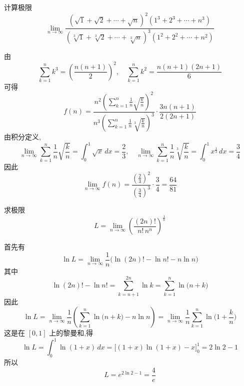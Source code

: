 \begin{questions}
    \question 计算极限
    \[
    \lim_{n\to\infty} \frac{\left(\sqrt{1}+\sqrt{2}+\cdots+\sqrt{n}\right)^{2}\left(1^{3}+2^{3}+\cdots+n^{3}\right)}{\left(\sqrt[3]{1}+\sqrt[3]{2}+\cdots+\sqrt[3]{n}\right)^{3}\left(1^{2}+2^{2}+\cdots+n^{2}\right)}
    \]
    \begin{solution}
        由
        \[
        \sum_{k=1}^n k^3 = \left(\frac{n(n+1)}{2}\right)^2,\quad \sum_{k=1}^n k^2 = \frac{n(n+1)(2n+1)}{6}
        \]
        可得
        \[
        f(n)=\frac{\displaystyle n^2\left(\sum_{k=1}^n \frac{1}{n}\sqrt{\frac{k}{n}}\right)^2}{\displaystyle n^3\left(\sum_{k=1}^n \frac{1}{n}\sqrt[3]{\frac{k}{n}}\right)^3} \cdot \frac{3n(n+1)}{2(2n+1)}
        \]
        由积分定义,
        \[
        \lim_{n\to\infty} \sum_{k=1}^n \frac{1}{n}\sqrt{\frac{k}{n}} = \int_0^1 \sqrt{x}\,dx = \frac{2}{3},\quad
        \lim_{n\to\infty} \sum_{k=1}^n \frac{1}{n}\sqrt[3]{\frac{k}{n}} = \int_0^1 x^{\frac{1}{3}}\,dx = \frac{3}{4}
        \]
        因此
        \[
        \lim_{n\to\infty} f(n) = \frac{\left(\frac{2}{3}\right)^2}{\left(\frac{3}{4}\right)^3} \cdot \frac{3}{4} = \frac{64}{81}
        \]
    \end{solution}

    \question 求极限
    \[
    L=\lim_{n\to\infty}\left(\frac{(2n)!}{n!\,n^{n}}\right)^{\frac{1}{n}}
    \]
    \begin{solution}
        首先有
        \[
        \ln L=\lim_{n\to\infty}\frac{1}{n}\Big(\ln(2n)!-\ln n! - n\ln n\Big)
        \]
        其中
        \[
        \ln(2n)!-\ln n! = \sum_{k=n+1}^{2n}\ln k=\sum_{k=1}^{n}\ln\!\big(n+k\big)
        \]
        因此
        \[
        \ln L=\lim_{n\to\infty}\frac{1}{n}\left(\sum_{k=1}^{n}\ln\!\big(n+k\big)-n\ln n\right)
        =\lim_{n\to\infty}\frac{1}{n}\sum_{k=1}^{n}\ln\!\Big(1+\frac{k}{n}\Big)
        \]
        这是在 $[0,1]$ 上的黎曼和,得
        \[
        \ln L=\int_0^1 \ln(1+x)\,dx
        =\big[(1+x)\ln(1+x)-x\big]_0^1=2\ln 2-1
        \]
        所以
        \[
        L=e^{2\ln 2-1}=\frac{4}{e}
        \]
    \end{solution}


\end{questions}

